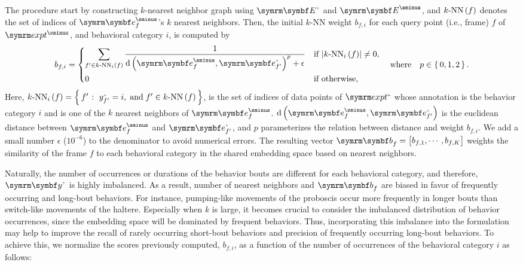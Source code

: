 The procedure start by constructing $k$-nearest neighbor graph using $\Ann{\V{E}}$ and $\Unann{\V{E}}$, and ${k\mathrm{\textnormal{-}NN}} \left( f \right)$ denotes the set of indices of $\Unann{\V{e}}_f$'s $k$ nearest neighbors. Then, the initial $k$-NN weight $b_{f,i}$ for each query point (i.e., frame) $f$ of $\exptUnann$, and behavioral category $i$, is computed by
\begin{equation}
	b_{f,i} = \begin{dcases}
		\sum_{f^\prime \in \NNi{k}{i}{f}}\frac{1}{\dist{\Unann{\V{e}}_f}{\Ann{\V{e}}_{f^\prime}}^p + \epsilon} & \textnormal{if } \card{\NNi{k}{i}{f}} \neq 0, \\
		0                                                                                                      & \textnormal{if otherwise},
	\end{dcases} \qbwhere p \in \set{0,1,2}.
\end{equation}
Here, $\NNi{k}{i}{f}=\Set{f^\prime}{\Ann{y}_{f^\prime}=i, \dband f^\prime \in \NN{k}{f}}$, is the set of indices of data points of $\exptAnn$ whose annotation is the behavior category $i$ and is one of the $k$ nearest neighbors of $\Unann{\V{e}}_f$.
$\dist{\Unann{\V{e}}_f}{\Ann{\V{e}}_{f^\prime}}$ is the euclidean distance between $\Unann{\V{e}}_f$ and $\Ann{\V{e}}_{f^\prime}$, and $p$ parameterizes the relation between distance and weight $b_{f,i}$.
We add a small number $\epsilon$ ($10^{{-}6}$) to the denominator to avoid numerical errors.
The resulting vector $\V{b}_f = \qmatrix{b_{f,1}, \cdots, b_{f,K}}$ weights the similarity of the frame $f$ to each behavioral category in the shared embedding space based on nearest neighbors.

Naturally, the number of occurrences or durations of the behavior bouts are different for each behavioral category, and therefore, $\Ann{\V{y}}$ is highly imbalanced.
As a result, number of nearest neighbors and $\V{b}_f$ are biased in favor of frequently occurring and long-bout behaviors.
For instance, pumping-like movements of the proboscis occur more frequently in longer bouts than switch-like movements of the haltere.
Especially when $k$ is large, it becomes crucial to consider the imbalanced distribution of behavior occurrences, since the embedding space will be dominated by frequent behaviors.
Thus, incorporating this imbalance into the formulation may help to improve the recall of rarely occurring short-bout behaviors and precision of frequently occurring long-bout behaviors.
To achieve this, we normalize the scores previously computed, $b_{f,i}$, as a function of the number of occurrences of the behavioral category $i$ as follows:

